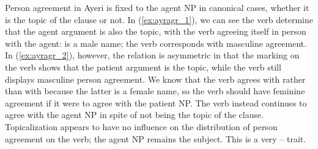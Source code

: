 Person agreement in Ayeri is fixed to the agent NP in canonical cases, whether
it is the topic of the clause or not. In (\ref{ex:ayragr_1}), we can see the
verb determine that the agent argument is also the topic, with the verb
agreeing itself in person with the agent:  is a male name;
the verb corresponds with masculine agreement. In (\ref{ex:ayragr_2}), however,
the relation is asymmetric in that the marking on the verb shows that the
patient argument is the topic, while the verb still displays masculine person
agreement. We know that the verb agrees with  rather than
with  because the latter is a female name, so the verb should
have feminine agreement if it were to agree with the patient NP. The verb
instead continues to agree with the agent NP in spite of not being the topic of
the clause. Topicalization appears to have no influence on the distribution of
person agreement on the verb; the agent NP remains the subject. This is a very
\Nom{}--\Acc{} trait.

